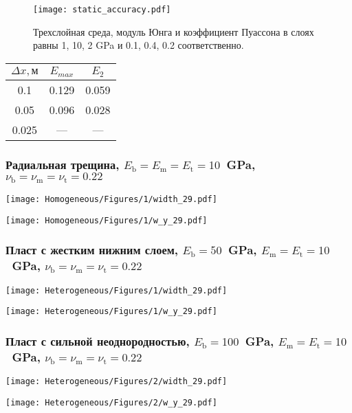 \begin{frame}
    \centering
    \begin{figure}
        \texttt{[image: static\_accuracy.pdf]}
        \caption{\footnotesize{Трехслойная среда, модуль Юнга и коэффициент Пуассона в слоях равны 1, 10, 2 GPa и 0.1, 0.4, 0.2 соответственно.}}
    \end{figure}

    \begin{tabular}{|c|c|c|}
        \hline
        $\Delta x, \text{м}$ & $E_{max}$ & $E_2$ \\
        \hline
        0.1                     & 0.129     & 0.059 \\
        \hline
        0.05                    & 0.096     & 0.028 \\
        \hline
        0.025 & --- & --- \\
        \hline
    \end{tabular}
\end{frame}

\begin{frame}
    \frametitle{Радиальная трещина, $E_\text{b} = E_\text{m} = E_\text{t} = 10$~GPa, $\nu_\text{b} = \nu_\text{m} = \nu_\text{t} = 0.22$}
    \begin{minipage}[t]{0.4\linewidth}
        \texttt{[image: Homogeneous/Figures/1/width\_29.pdf]}
    \end{minipage}
    \hfill
    \begin{minipage}[t]{0.57\linewidth}
        \texttt{[image: Homogeneous/Figures/1/w\_y\_29.pdf]}
    \end{minipage}
\end{frame}

\begin{frame}
    \frametitle{Пласт с жестким нижним слоем, $E_\text{b} = 50$~GPa, $E_\text{m} = E_\text{t} = 10$~GPa, $\nu_\text{b} = \nu_\text{m} = \nu_\text{t} = 0.22$}
    \begin{minipage}[t]{0.4\linewidth}
        \texttt{[image: Heterogeneous/Figures/1/width\_29.pdf]}
    \end{minipage}
    \hfill
    \begin{minipage}[t]{0.57\linewidth}
        \texttt{[image: Heterogeneous/Figures/1/w\_y\_29.pdf]}
    \end{minipage}
\end{frame}

\begin{frame}
    \frametitle{Пласт с сильной неоднородностью, $E_\text{b} = 100$~GPa, $E_\text{m} = E_\text{t} = 10$~GPa, $\nu_\text{b} = \nu_\text{m} = \nu_\text{t} = 0.22$}
    \begin{minipage}[t]{0.4\linewidth}
        \texttt{[image: Heterogeneous/Figures/2/width\_29.pdf]}
    \end{minipage}
    \hfill
    \begin{minipage}[t]{0.57\linewidth}
        \texttt{[image: Heterogeneous/Figures/2/w\_y\_29.pdf]}
    \end{minipage}
\end{frame}

